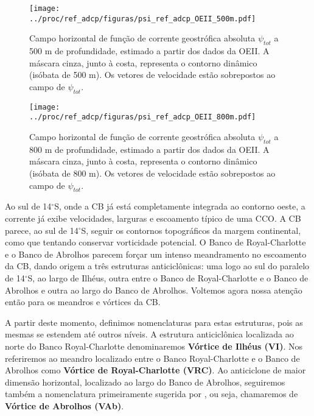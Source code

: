 \begin{figure}%
 \begin{center}
  \texttt{[image: ../proc/ref\_adcp/figuras/psi\_ref\_adcp\_OEII\_500m.pdf]}
 \end{center}
 \vspace{-.25cm}
 \renewcommand{\baselinestretch}{1}
 \caption{\label{fig:psi_oeii500} \small Campo horizontal de função de corrente geostrófica absoluta $\psi_{tot}$ a 500 m de profundidade, estimado a partir dos dados da OEII. 
 A máscara cinza, junto à costa, representa o contorno dinâmico (isóbata de 500 m). Os vetores de velocidade
 estão sobrepostos ao campo de $\psi_{tot}$.}
\end{figure}

\begin{figure}%
 \begin{center}
  \texttt{[image: ../proc/ref\_adcp/figuras/psi\_ref\_adcp\_OEII\_800m.pdf]}
 \end{center}
 \vspace{-.25cm}
 \renewcommand{\baselinestretch}{1}
 \caption{\label{fig:psi_oeii800} \small Campo horizontal de função de corrente geostrófica absoluta $\psi_{tot}$ a 800 m de profundidade, estimado a partir dos dados da OEII. 
 A máscara cinza, junto à costa, representa o contorno dinâmico (isóbata de 800 m). Os vetores de velocidade
 estão sobrepostos ao campo de $\psi_{tot}$.}
\end{figure}

Ao sul de 14$^\circ$S, onde a CB já está completamente integrada ao contorno oeste, a corrente
já exibe velocidades, larguras e escoamento típico de uma CCO. A CB parece, ao sul de 14$^\circ$S,
seguir os contornos topográficos da margem continental, como que tentando conservar
 vorticidade potencial. O Banco de Royal-Charlotte e o Banco de Abrolhos
parecem forçar um intenso meandramento no escoamento da CB, dando origem a três estruturas
anticiclônicas: uma logo ao sul do paralelo de 14$^\circ$S, ao largo de Ilhéus, outra entre
o Banco de Royal-Charlotte e o Banco de Abrolhos e outra ao largo do Banco de Abrolhos. 
Voltemos agora nossa atenção então para os meandros e vórtices da CB. 

 A partir deste momento, definimos nomenclaturas para estas estruturas, pois
as mesmas se estendem até outros níveis. A estrutura anticiclônica localizada ao norte do 
Banco Royal-Charlotte denominaremos {\bf Vórtice de Ilhéus (VI)}. Nos referiremos ao meandro
localizado entre o Banco Royal-Charlotte e o Banco de Abrolhos como {\bf Vórtice de Royal-Charlotte
(VRC)}.
 Ao anticiclone de maior dimensão horizontal, localizado ao largo do Banco de Abrolhos, 
seguiremos também a nomenclatura primeiramente sugerida por \cite{silveira_etal2006B}, ou seja, 
chamaremos de {\bf Vórtice de Abrolhos (VAb)}. 

